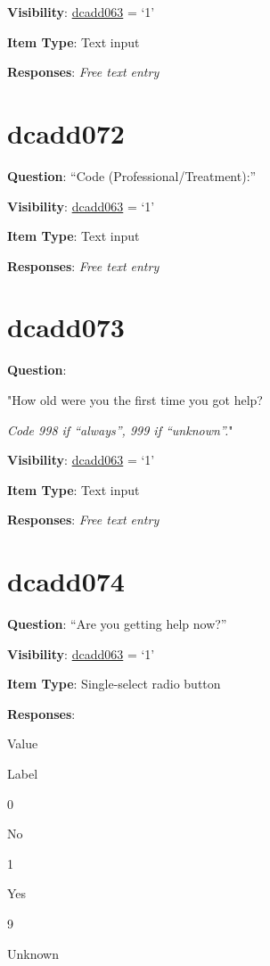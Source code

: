 \documentclass[]{book}
\begin{document}
\textbf{Visibility}: \protect\hyperlink{dcadd063}{dcadd063} = `1'

\textbf{Item Type}: Text input

\textbf{Responses}: \emph{Free text entry}

\hypertarget{dcadd072}{%
\section{dcadd072}\label{dcadd072}}

\textbf{Question}: ``Code (Professional/Treatment):''

\textbf{Visibility}: \protect\hyperlink{dcadd063}{dcadd063} = `1'

\textbf{Item Type}: Text input

\textbf{Responses}: \emph{Free text entry}

\hypertarget{dcadd073}{%
\section{dcadd073}\label{dcadd073}}

\textbf{Question}:

"How old were you the first time you got help?

\emph{Code 998 if ``always'', 999 if ``unknown''.}"

\textbf{Visibility}: \protect\hyperlink{dcadd063}{dcadd063} = `1'

\textbf{Item Type}: Text input

\textbf{Responses}: \emph{Free text entry}

\hypertarget{dcadd074}{%
\section{dcadd074}\label{dcadd074}}

\textbf{Question}: ``Are you getting help now?''

\textbf{Visibility}: \protect\hyperlink{dcadd063}{dcadd063} = `1'

\textbf{Item Type}: Single-select radio button

\textbf{Responses}:

Value

Label

0

No

1

Yes

9

Unknown
\end{document}
